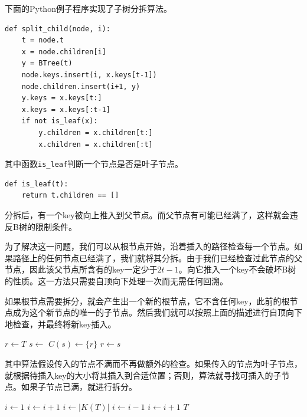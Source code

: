 \documentclass{ctexart}
\begin{document}
下面的Python例子程序实现了子树分拆算法。

\lstset{language=Python}
\begin{lstlisting}
def split_child(node, i):
    t = node.t
    x = node.children[i]
    y = BTree(t)
    node.keys.insert(i, x.keys[t-1])
    node.children.insert(i+1, y)
    y.keys = x.keys[t:]
    x.keys = x.keys[:t-1]
    if not is_leaf(x):
        y.children = x.children[t:]
        x.children = x.children[:t]
\end{lstlisting}

其中函数\texttt{is\_leaf}判断一个节点是否是叶子节点。

\lstset{language=Python}
\begin{lstlisting}
def is_leaf(t):
    return t.children == []
\end{lstlisting}

\label{split}

分拆后，有一个key被向上推入到父节点。而父节点有可能已经满了，这样就会违反B树的限制条件。

为了解决这一问题，我们可以从根节点开始，沿着插入的路径检查每一个节点。如果路径上的任何节点已经满了，我们就将其分拆。由于我们已经检查过此节点的父节点，因此该父节点所含有的key一定少于$2t-1$。向它推入一个key不会破坏B树的性质。这一方法只需要自顶向下处理一次而无需任何回溯。

如果根节点需要拆分，就会产生出一个新的根节点，它不含任何key，此前的根节点成为这个新节点的唯一的子节点。然后我们就可以按照上面的描述进行自顶向下地检查，并最终将新key插入。

\begin{algorithmic}[1]
  \State $r \gets T$
   
    \State $s \gets$ 
    \State $C(s) \gets \{r\}$
    \State {}
    \State $r \gets s$
  \EndIf
  \State \Return {}
\EndFunction
\end{algorithmic}

其中算法假设传入的节点不满而不再做额外的检查。如果传入的节点为叶子节点，就根据待插入key的大小将其插入到合适位置；否则，算法就寻找可插入的子节点。如果子节点已满，就进行拆分。

\begin{algorithmic}[1]
    \State $i \gets 1$
      \State $i \gets i+1$
    \EndWhile
    \State {}
  \Else
    \State $i \gets |K(T)|$
      \State $i \gets i-1$
    \EndWhile
      \State {}
        \State $i \gets i+1$
      \EndIf
    \EndIf
    \State {}
  \EndIf
  \State \Return $T$
\EndFunction
\end{algorithmic}
\end{document}
